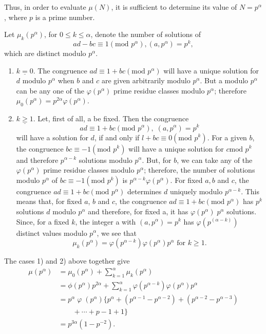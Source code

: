 Thus, in order to evaluate $\mu(N)$, it is sufficient to determine its
value of $N=p^{\alpha}$, where $p$ is a prime number.

Let $\mu_k(p^{\alpha})$, for $0\leq k \leq \alpha$, denote the number
of solutions of 
$$
ad - bc \equiv 1 (\text{mod } p^{\alpha}), (a, p^{\alpha}) = p^k,
$$\pageoriginale
which are distinct modulo $p^{\alpha}$.
\begin{enumerate}
\renewcommand{\labelenumi}{\theenumi)}
\item $\underline{k=0}$. The congruence $ad\equiv 1+bc(\text{mod }
  p^{\alpha})$ will have a unique solution for $d$ modulo
  $p^{\alpha}$ when $b$ and $c$ are given arbitrarily modulo
  $p^{\alpha}$. But a modulo $p^{\alpha}$ can be any one of the
  $\varphi(p^{\alpha})$ prime residue classes modulo $p^{\alpha}$;
  therefore $\mu_0(p^{\alpha})=p^{2\alpha}\varphi(p^{\alpha})$.

\item $\underline{k\geq 1}$. Let, first of all, a be fixed. Then the
  congruence 
$$
ad \equiv 1 + bc (\text{mod } p^{\alpha}), \; (a, p^{\alpha}) = p^k
$$
will have a solution for $d$, if and only if $l+bc\equiv 0(\text{mod }
p^k)$. For a given $b$, the congruence $bc\equiv -1(\text{mod } p^k)$ will
have a unique solution for $c\text{mod } p^k$ and therefore $p^{\alpha-k}$
solutions modulo $p^{\alpha}$. But, for $b$, we can take any of the
$\varphi(p^{\alpha})$ prime residue classes modulo $p^{\alpha}$;
therefore, the number of solutions modulo $p^{\alpha}$ of $bc\equiv
-1(\text{mod } p^k)$ is $p^{\alpha -k}\varphi(p^{\alpha})$. For fixed $a,b$
and $c$, the congruence $ad\equiv 1+bc (\text{mod } p^{\alpha})$ determines
$d$ uniquely modulo $p^{\alpha -k}$. This means that, for fixed $a$,
$b$ and $c$, the congruence $ad\equiv 1 + bc (\text{mod } p^{\alpha})$ has
$p^k$ solutions $d$ modulo $p^{\alpha}$ and therefore, for fixed a,
it has $\varphi(p^{\alpha}) \; p^{\alpha}$ solutions. Since, for a fixed
$k$, the integer a with $(a,p^{\alpha})=p^k$ has
$\varphi(p^{(\alpha-k)})$ distinct values modulo $p^{\alpha}$, we see
that 
$$
\mu_k(p^{\alpha}) = \varphi(p^{\alpha - k}) \varphi(p^{\alpha}) p^{\alpha}
\text{ for } k \geq 1.
$$
\end{enumerate}

The cases 1) and 2) above together give 
\begin{align*}
\mu(p^{\alpha}) & = \mu_0(p^{\alpha}) + \sum^{\alpha}_{k=1} \mu_k
(p^{\alpha})\\
&= \phi (p^{\alpha}) p^{2\alpha}+ \sum^{\alpha}_{k=1}
\varphi(p^{\alpha-k}) \varphi(p^{\alpha}) p^{\alpha}\\
& = p^{\alpha}\; \varphi \; (p^{\alpha}) \{p^{\alpha}+
(p^{\alpha-1}-p^{\alpha-2}) + (p^{\alpha -2} - p^{\alpha-3})\\ 
&\qquad{}+ \cdots + p-1+1\}\\
& = p^{3\alpha}(1-p^{-2}).
\end{align*}\pageoriginale

